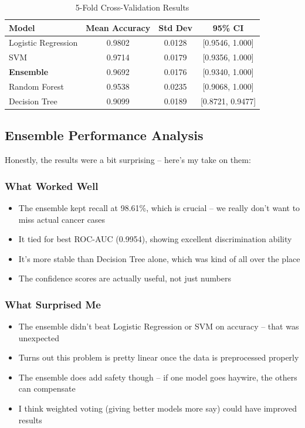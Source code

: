 \documentclass[12pt]{article}
\begin{document}
\begin{table}[H]
\centering
\caption{5-Fold Cross-Validation Results}
\begin{tabular}{|l|c|c|c|}
\hline
\textbf{Model} & \textbf{Mean Accuracy} & \textbf{Std Dev} & \textbf{95\% CI} \\ \hline
Logistic Regression & 0.9802 & 0.0128 & [0.9546, 1.000] \\ \hline
SVM & 0.9714 & 0.0179 & [0.9356, 1.000] \\ \hline
\textbf{Ensemble} & 0.9692 & 0.0176 & [0.9340, 1.000] \\ \hline
Random Forest & 0.9538 & 0.0235 & [0.9068, 1.000] \\ \hline
Decision Tree & 0.9099 & 0.0189 & [0.8721, 0.9477] \\ \hline
\end{tabular}
\end{table}

\subsection{Ensemble Performance Analysis}

Honestly, the results were a bit surprising -- here's my take on them:

\subsubsection{What Worked Well}
\begin{itemize}
    \item The ensemble kept recall at 98.61\%, which is crucial -- we really don't want to miss actual cancer cases
    \item It tied for best ROC-AUC (0.9954), showing excellent discrimination ability
    \item It's more stable than Decision Tree alone, which was kind of all over the place
    \item The confidence scores are actually useful, not just numbers
\end{itemize}

\subsubsection{What Surprised Me}
\begin{itemize}
    \item The ensemble didn't beat Logistic Regression or SVM on accuracy -- that was unexpected
    \item Turns out this problem is pretty linear once the data is preprocessed properly
    \item The ensemble does add safety though -- if one model goes haywire, the others can compensate
    \item I think weighted voting (giving better models more say) could have improved results
\end{itemize}
\end{document}
